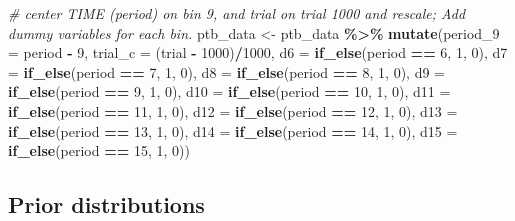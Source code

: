 \documentclass[
  man,floatsintext]{apa6}
\newenvironment{Shaded}{\begin{snugshade}}{\end{snugshade}}
\newcommand{\AttributeTok}[1]{\textcolor[rgb]{0.13,0.29,0.53}{#1}}
\newcommand{\CommentTok}[1]{\textcolor[rgb]{0.56,0.35,0.01}{\textit{#1}}}
\newcommand{\DecValTok}[1]{\textcolor[rgb]{0.00,0.00,0.81}{#1}}
\newcommand{\FunctionTok}[1]{\textcolor[rgb]{0.13,0.29,0.53}{\textbf{#1}}}
\newcommand{\NormalTok}[1]{#1}
\newcommand{\OtherTok}[1]{\textcolor[rgb]{0.56,0.35,0.01}{#1}}
\newcommand{\SpecialCharTok}[1]{\textcolor[rgb]{0.81,0.36,0.00}{\textbf{#1}}}
\begin{document}
\begin{Shaded}
\begin{Highlighting}[]
\CommentTok{\# center TIME (period) on bin 9, and trial on trial 1000 and rescale; Add dummy variables for each bin.}
\NormalTok{ptb\_data }\OtherTok{\textless{}{-}}\NormalTok{ ptb\_data }\SpecialCharTok{\%\textgreater{}\%} 
        \FunctionTok{mutate}\NormalTok{(}\AttributeTok{period\_9 =}\NormalTok{ period }\SpecialCharTok{{-}} \DecValTok{9}\NormalTok{,}
               \AttributeTok{trial\_c =}\NormalTok{ (trial }\SpecialCharTok{{-}} \DecValTok{1000}\NormalTok{)}\SpecialCharTok{/}\DecValTok{1000}\NormalTok{,}
               \AttributeTok{d6  =} \FunctionTok{if\_else}\NormalTok{(period }\SpecialCharTok{==} \DecValTok{6}\NormalTok{, }\DecValTok{1}\NormalTok{, }\DecValTok{0}\NormalTok{),}
               \AttributeTok{d7  =} \FunctionTok{if\_else}\NormalTok{(period }\SpecialCharTok{==} \DecValTok{7}\NormalTok{, }\DecValTok{1}\NormalTok{, }\DecValTok{0}\NormalTok{),}
               \AttributeTok{d8  =} \FunctionTok{if\_else}\NormalTok{(period }\SpecialCharTok{==} \DecValTok{8}\NormalTok{, }\DecValTok{1}\NormalTok{, }\DecValTok{0}\NormalTok{),}
               \AttributeTok{d9  =} \FunctionTok{if\_else}\NormalTok{(period }\SpecialCharTok{==} \DecValTok{9}\NormalTok{, }\DecValTok{1}\NormalTok{, }\DecValTok{0}\NormalTok{),}
               \AttributeTok{d10 =} \FunctionTok{if\_else}\NormalTok{(period }\SpecialCharTok{==} \DecValTok{10}\NormalTok{, }\DecValTok{1}\NormalTok{, }\DecValTok{0}\NormalTok{),}
               \AttributeTok{d11 =} \FunctionTok{if\_else}\NormalTok{(period }\SpecialCharTok{==} \DecValTok{11}\NormalTok{, }\DecValTok{1}\NormalTok{, }\DecValTok{0}\NormalTok{),}
               \AttributeTok{d12 =} \FunctionTok{if\_else}\NormalTok{(period }\SpecialCharTok{==} \DecValTok{12}\NormalTok{, }\DecValTok{1}\NormalTok{, }\DecValTok{0}\NormalTok{),}
               \AttributeTok{d13 =} \FunctionTok{if\_else}\NormalTok{(period }\SpecialCharTok{==} \DecValTok{13}\NormalTok{, }\DecValTok{1}\NormalTok{, }\DecValTok{0}\NormalTok{),}
               \AttributeTok{d14 =} \FunctionTok{if\_else}\NormalTok{(period }\SpecialCharTok{==} \DecValTok{14}\NormalTok{, }\DecValTok{1}\NormalTok{, }\DecValTok{0}\NormalTok{),}
               \AttributeTok{d15 =} \FunctionTok{if\_else}\NormalTok{(period }\SpecialCharTok{==} \DecValTok{15}\NormalTok{, }\DecValTok{1}\NormalTok{, }\DecValTok{0}\NormalTok{))}
\end{Highlighting}
\end{Shaded}

\normalsize

\subsection{Prior distributions}\label{prior-distributions}
\end{document}
